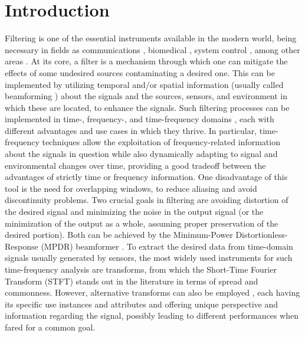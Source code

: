 \section{Introduction}
\label{sec:introduction}

Filtering is one of the essential instruments available in the modern world, being necessary in fields as communications \cite{chen_source_2002}, biomedical \cite{lobato_worst-case-optimization_2020,lu_biomedical_1994,nguyen_minimum_2017}, system control \cite{han_comparative_2016, hagglund_signal_2012}, among other areas \cite{hathcock_noise_2016,lee_general_2002,shi_new_2004}. At its core, a filter is a mechanism through which one can mitigate the effects of some undesired sources contaminating a desired one. This can be implemented by utilizing temporal and/or spatial information (usually called beamforming \cite{dougherty_functional_2014}) about the signals and the sources, sensors, and environment in which these are located, to enhance the signals. Such filtering processes can be implemented in time-, frequency-, and time-frequency domains \cite{benesty_fundamentals_2017}, each with different advantages and use cases in which they thrive. In particular, time-frequency techniques allow the exploitation of frequency-related information about the signals in question while also dynamically adapting to signal and environmental changes over time, providing a good tradeoff between the advantages of strictly time or frequency information. One disadvantage of this tool is the need for overlapping windows, to reduce aliasing and avoid discontinuity problems. Two crucial goals in filtering are avoiding distortion of the desired signal and minimizing the noise in the output signal (or the minimization of the output as a whole, assuming proper preservation of the desired portion). Both can be achieved by the Minimum-Power Distortionless-Response (MPDR) beamformer \cite{capon_high-resolution_1969,erdogan_improved_2016}. To extract the desired data from time-domain signals usually generated by sensors, the most widely used instruments for such time-frequency analysis are transforms, from which the Short-Time Fourier Transform (STFT) \cite{kiymik_comparison_2005,pan_microphone_2021} stands out in the literature in terms of spread and commonness. However, alternative transforms can also be employed \cite{chen_wavelet-based_2018,yang_general_2014,almeida_fractional_1994}, each having its specific use instances and attributes and offering unique perspective and information regarding the signal, possibly leading to different performances when fared for a common goal.

